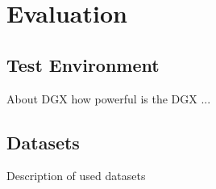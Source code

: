 \chapter{Evaluation}
\label{sec:evaluation}
%

\section{Test Environment}
About DGX how powerful is the DGX ...

\section{Datasets}
Description of used datasets

